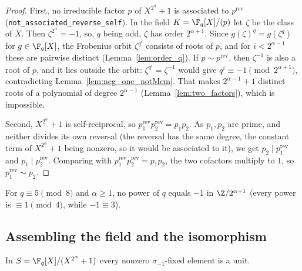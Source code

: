\begin{proof}
First, no irreducible factor $p$ of $X^{2^\alpha}+1$ is associated to $p^{\mathrm{rev}}$
(\texttt{not\_associated\_reverse\_self}). In the field $K = \F_q[X]/(p)$ let $\zeta$ be
the class of $X$. Then $\zeta^{2^\alpha} = -1$, so, $q$ being odd, $\zeta$ has order
$2^{\alpha+1}$. Since $g(\zeta)^q = g(\zeta^q)$ for $g \in \F_q[X]$, the Frobenius orbit
$\zeta^{q^i}$ consists of roots of $p$, and for $i < 2^{\alpha-1}$ these are pairwise distinct
(Lemma~\ref{lem:order_q}). If $p \sim p^{\mathrm{rev}}$, then $\zeta^{-1}$ is also a root of $p$,
and it lies outside the orbit: $\zeta^{q^i} = \zeta^{-1}$ would give
$q^i \equiv -1 \pmod{2^{\alpha+1}}$, contradicting Lemma~\ref{lem:neg_one_notMem}. That makes
$2^{\alpha-1} + 1$ distinct roots of a polynomial of degree $2^{\alpha-1}$
(Lemma~\ref{lem:two_factors}), which is impossible.

Second, $X^{2^\alpha}+1$ is self-reciprocal, so $p_1^{\mathrm{rev}} p_2^{\mathrm{rev}} = p_1 p_2$.
As $p_1, p_2$ are prime, and neither divides its own reversal (the reversal has the same degree,
the constant term of $X^{2^\alpha}+1$ being nonzero, so it would be associated to it), we get
$p_2 \mid p_1^{\mathrm{rev}}$ and $p_1 \mid p_2^{\mathrm{rev}}$. Comparing with $p_1^{\mathrm{rev}} p_2^{\mathrm{rev}} = p_1 p_2$, the
two cofactors multiply to $1$, so $p_1^{\mathrm{rev}} \sim p_2$.
\end{proof}

\begin{lemma}\label{lem:neg_one_notMem}
\leanok
For $q \equiv 5 \pmod 8$ and $\alpha \ge 1$, no power of $q$ equals $-1$ in $\Z/2^{\alpha+1}$ (every
power is $\equiv 1 \pmod 4$, while $-1 \equiv 3$).
\end{lemma}

\subsection{Assembling the field and the isomorphism}

\begin{theorem}\label{thm:core_unit}
\leanok
{}
In $S = \F_q[X]/(X^{2^\alpha}+1)$ every nonzero $\sigma_{-1}$-fixed element is a unit.
\end{theorem}

